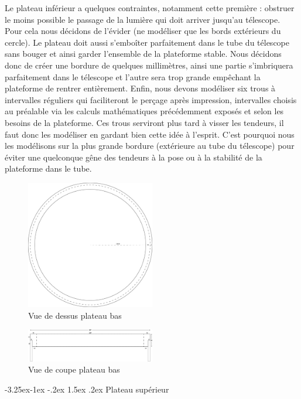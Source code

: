 \documentclass[a4paper,12pt]{article}
\makeatletter
\newcounter{subsubsubsection}[subsubsection]
\newcommand\subsubsubsection{\@startsection{subsubsubsection}{4}{\z@}%
                                     {-3.25ex\@plus -1ex \@minus -.2ex}%
                                     {1.5ex \@plus .2ex}%
                                     {\normalfont\small\bfseries}}
\makeatother
\begin{document}
Le plateau inférieur a quelques contraintes,
notamment cette première : obstruer le moins possible le passage de la lumière qui doit arriver jusqu’au télescope. 
Pour cela nous décidons de l'évider (ne modéliser que les bords extérieurs du cercle). 
Le plateau doit aussi s’emboîter parfaitement dans le tube du télescope sans bouger et ainsi garder l’ensemble de la plateforme stable. 
Nous décidons donc de créer une bordure de quelques millimètres, ainsi une partie s’imbriquera parfaitement dans le télescope et l’autre sera trop grande empêchant la plateforme de rentrer entièrement. 
Enfin, nous devons modéliser six trous à intervalles réguliers qui faciliteront le perçage après impression, intervalles choisis au préalable via les calculs mathématiques précédemment exposés et selon les besoins de la plateforme. 
Ces trous serviront plus tard à visser les tendeurs, il faut donc les modéliser en gardant bien cette idée à l’esprit. C’est pourquoi nous les modélisons sur la plus grande bordure (extérieure au tube du télescope) pour éviter une quelconque gêne des tendeurs à la pose ou à la stabilité de la plateforme dans le tube.

\begin{figure}[H]
  \centering
  \includegraphics[width=0.5\textwidth]{vue de dessus plateau bas.jpg}
  \caption{Vue de dessus plateau bas}
\end{figure}
\begin{figure}[H]
  \centering
  \includegraphics[width=0.5\textwidth]{vue de coupe plateau bas.jpg}
  \caption{Vue de coupe plateau bas}
\end{figure}

\subsubsubsection{Plateau supérieur}
\end{document}
